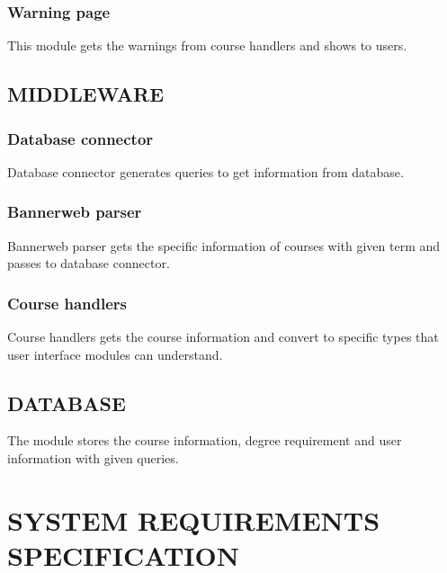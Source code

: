 \documentclass[twoside,letterpaper]{article}
\begin{document}
\subsubsection[Warning page]{\rmfamily\bfseries\color{black}
Warning page}
{\color{black}
{This module gets the warnings from course handlers and shows to users. }}

\subsection[MIDDLEWARE]{\rmfamily\bfseries\color{black}
MIDDLEWARE}
\subsubsection[Database connector]{\rmfamily\bfseries\color{black}
Database connector}
{\color{black}
{Database connector generates queries to get information from database.}}

\subsubsection[Bannerweb parser]{\rmfamily\bfseries\color{black}
Bannerweb parser}
{\color{black}
{Bannerweb parser gets the specific information of courses with given term and passes to database connector.}}

\subsubsection[Course handlers]{\rmfamily\bfseries\color{black}
Course handlers}
{\color{black}
{Course handlers gets the course information and convert to specific types that user interface modules can understand.}}

\subsection[DATABASE]{\rmfamily\bfseries\color{black}
DATABASE}
{\color{black}
{The module stores the course information, degree requirement and user information with given queries.}}



\clearpage\section[SYSTEM REQUIREMENTS SPECIFICATION]{\rmfamily\bfseries\color{black}
SYSTEM REQUIREMENTS SPECIFICATION}
\end{document}
